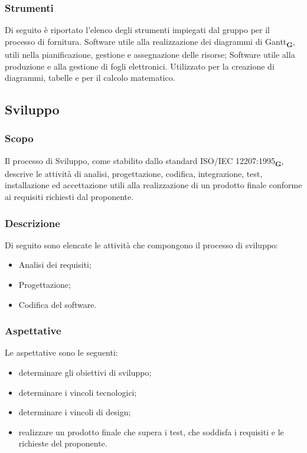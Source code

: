 \subsubsection{Strumenti}
Di seguito è riportato l’elenco degli strumenti impiegati dal gruppo per il processo di fornitura.
Software utile alla realizzazione dei diagrammi di Gantt\textsubscript{\textbf{G}}, utili nella pianificazione, gestione e assegnazione delle risorse;
Software utile alla produzione e alla gestione di fogli elettronici. Utilizzato per la creazione di diagrammi, tabelle e per il calcolo matematico.
\subsection{Sviluppo}
\subsubsection{Scopo}
Il processo di Sviluppo, come stabilito dallo standard ISO/IEC 12207:1995\textsubscript{\textbf{G}}, descrive le attività di analisi, progettazione, codifica, integrazione, test, installazione ed accettazione utili alla realizzazione di un prodotto finale conforme ai requisiti richiesti dal proponente.
\subsubsection{Descrizione}
Di seguito sono elencate le attività che compongono il processo di sviluppo:
\begin{itemize}
    \item Analisi dei requisiti;
    \item Progettazione;
    \item Codifica del software.
\end{itemize}
\subsubsection{Aspettative}
Le aspettative sono le seguenti:
\begin{itemize}
    \item determinare gli obiettivi di sviluppo;
    \item determinare i vincoli tecnologici;
    \item determinare i vincoli di design;
    \item realizzare un prodotto finale che supera i test, che soddisfa i requisiti e le richieste del proponente.
\end{itemize}

